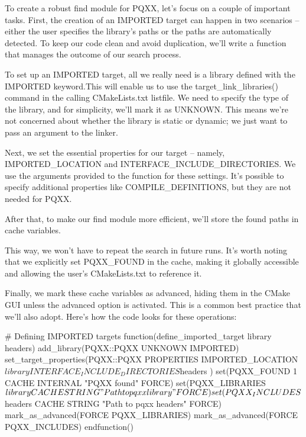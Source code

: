 To create a robust find module for PQXX, let’s focus on a couple of important tasks. First, the creation of an IMPORTED target can happen in two scenarios – either the user specifies the library’s paths or the paths are automatically detected. To keep our code clean and avoid duplication, we’ll write a function that manages the outcome of our search process.


To set up an IMPORTED target, all we really need is a library defined with the IMPORTED keyword.This will enable us to use the target\_link\_libraries() command in the calling CMakeLists.txt listfile. We need to specify the type of the library, and for simplicity, we’ll mark it as UNKNOWN. This means we’re not concerned about whether the library is static or dynamic; we just want to pass an argument to the linker.

Next, we set the essential properties for our target – namely, IMPORTED\_LOCATION and INTERFACE\_INCLUDE\_DIRECTORIES. We use the arguments provided to the function for these settings. It’s possible to specify additional properties like COMPILE\_DEFINITIONS, but they are not needed for PQXX.

After that, to make our find module more efficient, we’ll store the found paths in cache variables.

This way, we won’t have to repeat the search in future runs. It’s worth noting that we explicitly set PQXX\_FOUND in the cache, making it globally accessible and allowing the user’s CMakeLists.txt to reference it.

Finally, we mark these cache variables as advanced, hiding them in the CMake GUI unless the advanced option is activated. This is a common best practice that we’ll also adopt.
Here’s how the code looks for these operations:


\begin{cmake}
# Defining IMPORTED targets
function(define_imported_target library headers)
    add_library(PQXX::PQXX UNKNOWN IMPORTED)
    set_target_properties(PQXX::PQXX PROPERTIES
        IMPORTED_LOCATION ${library}
        INTERFACE_INCLUDE_DIRECTORIES ${headers}
    )
    set(PQXX_FOUND 1 CACHE INTERNAL "PQXX found" FORCE)
    set(PQXX_LIBRARIES ${library}
        CACHE STRING "Path to pqxx library" FORCE)
    set(PQXX_INCLUDES ${headers}
        CACHE STRING "Path to pqxx headers" FORCE)
    mark_as_advanced(FORCE PQXX_LIBRARIES)
    mark_as_advanced(FORCE PQXX_INCLUDES)
endfunction()
\end{cmake}

